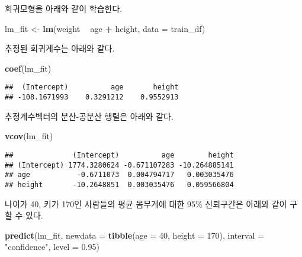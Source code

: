 \documentclass[]{book}
\newenvironment{Shaded}{\begin{snugshade}}{\end{snugshade}}
\newcommand{\DataTypeTok}[1]{\textcolor[rgb]{0.13,0.29,0.53}{#1}}
\newcommand{\DecValTok}[1]{\textcolor[rgb]{0.00,0.00,0.81}{#1}}
\newcommand{\FloatTok}[1]{\textcolor[rgb]{0.00,0.00,0.81}{#1}}
\newcommand{\KeywordTok}[1]{\textcolor[rgb]{0.13,0.29,0.53}{\textbf{#1}}}
\newcommand{\NormalTok}[1]{#1}
\newcommand{\OperatorTok}[1]{\textcolor[rgb]{0.81,0.36,0.00}{\textbf{#1}}}
\newcommand{\StringTok}[1]{\textcolor[rgb]{0.31,0.60,0.02}{#1}}
\begin{document}
회귀모형을 아래와 같이 학습한다.

\begin{Shaded}
\begin{Highlighting}[]
\NormalTok{lm_fit <-}\StringTok{ }\KeywordTok{lm}\NormalTok{(weight }\OperatorTok{~}\StringTok{ }\NormalTok{age }\OperatorTok{+}\StringTok{ }\NormalTok{height, }\DataTypeTok{data =}\NormalTok{ train_df)}
\end{Highlighting}
\end{Shaded}

추정된 회귀계수는 아래와 같다.

\begin{Shaded}
\begin{Highlighting}[]
\KeywordTok{coef}\NormalTok{(lm_fit)}
\end{Highlighting}
\end{Shaded}

\begin{verbatim}
##  (Intercept)          age       height 
## -108.1671993    0.3291212    0.9552913
\end{verbatim}

추정계수벡터의 분산-공분산 행렬은 아래와 같다.

\begin{Shaded}
\begin{Highlighting}[]
\KeywordTok{vcov}\NormalTok{(lm_fit)}
\end{Highlighting}
\end{Shaded}

\begin{verbatim}
##              (Intercept)          age        height
## (Intercept) 1774.3280624 -0.671107283 -10.264885141
## age           -0.6711073  0.004794717   0.003035476
## height       -10.2648851  0.003035476   0.059566804
\end{verbatim}

나이가 40, 키가 170인 사람들의 평균 몸무게에 대한 95\% 신뢰구간은 아래와 같이 구할 수 있다.

\begin{Shaded}
\begin{Highlighting}[]
\KeywordTok{predict}\NormalTok{(lm_fit, }\DataTypeTok{newdata =} \KeywordTok{tibble}\NormalTok{(}\DataTypeTok{age =} \DecValTok{40}\NormalTok{, }\DataTypeTok{height =} \DecValTok{170}\NormalTok{),}
        \DataTypeTok{interval =} \StringTok{"confidence"}\NormalTok{, }\DataTypeTok{level =} \FloatTok{0.95}\NormalTok{)}
\end{Highlighting}
\end{Shaded}
\end{document}
